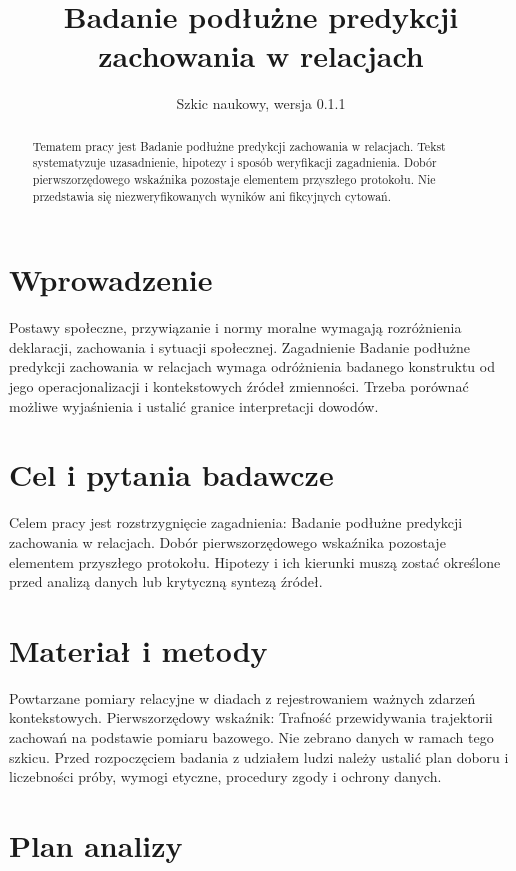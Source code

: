 \documentclass[11pt,a4paper]{article}
\title{Badanie podłużne predykcji zachowania w relacjach}
\author{}
\date{Szkic naukowy, wersja 0.1.1}
\begin{document}
\maketitle

\begin{abstract}

Tematem pracy jest Badanie podłużne predykcji zachowania w relacjach. Tekst systematyzuje uzasadnienie, hipotezy i sposób weryfikacji zagadnienia. Dobór pierwszorzędowego wskaźnika pozostaje elementem przyszłego protokołu. Nie przedstawia się niezweryfikowanych wyników ani fikcyjnych cytowań.

\end{abstract}

\section{Wprowadzenie}

Postawy społeczne, przywiązanie i normy moralne wymagają rozróżnienia deklaracji, zachowania i sytuacji społecznej. Zagadnienie Badanie podłużne predykcji zachowania w relacjach wymaga odróżnienia badanego konstruktu od jego operacjonalizacji i kontekstowych źródeł zmienności. Trzeba porównać możliwe wyjaśnienia i ustalić granice interpretacji dowodów.

\section{Cel i pytania badawcze}

Celem pracy jest rozstrzygnięcie zagadnienia: Badanie podłużne predykcji zachowania w relacjach. Dobór pierwszorzędowego wskaźnika pozostaje elementem przyszłego protokołu. Hipotezy i ich kierunki muszą zostać określone przed analizą danych lub krytyczną syntezą źródeł.

\section{Materiał i metody}

Powtarzane pomiary relacyjne w diadach z rejestrowaniem ważnych zdarzeń kontekstowych. Pierwszorzędowy wskaźnik: Trafność przewidywania trajektorii zachowań na podstawie pomiaru bazowego. Nie zebrano danych w ramach tego szkicu. Przed rozpoczęciem badania z udziałem ludzi należy ustalić plan doboru i liczebności próby, wymogi etyczne, procedury zgody i ochrony danych.

\section{Plan analizy}
\end{document}
